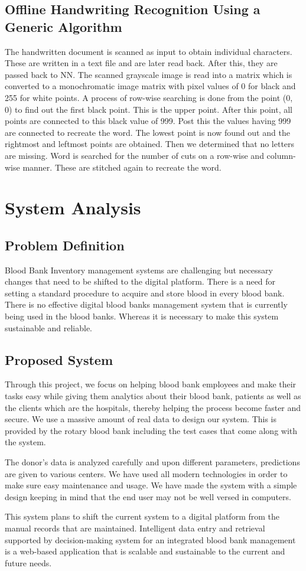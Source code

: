 \documentclass[BTech]{srmuthesis}
\begin{document}
\section{Offline Handwriting Recognition Using a Generic Algorithm}
The handwritten document is scanned as input to obtain individual characters. These are written in a text file and are later read back. After this, they are passed back to \ac{NN}. The scanned grayscale image is read into a matrix which is converted to a monochromatic image matrix with pixel values of 0 for black and 255 for white points. A process of row-wise searching is done from the point (0, 0) to find out the first black point. This is the upper point. After this point, all points are connected to this black value of 999. Post this the values having 999 are connected to recreate the word. The lowest point is now found out and the rightmost and leftmost points are obtained. Then we determined that no letters are missing. Word is searched for the number of cuts on a row-wise and column-wise manner. These are stitched again to recreate the word. \cite{handwritingalgobook}


\chapter{System Analysis}
\section{Problem Definition}
Blood Bank Inventory management systems are challenging but necessary changes that need to be shifted to the digital platform. There is a need for setting a standard procedure to acquire and store blood in every blood bank. There is no effective digital blood banks management system that is currently being used in the blood banks. Whereas it is necessary to make this system sustainable and reliable. \cite{medium_design_process}
\section{Proposed System}
Through this project, we focus on helping blood bank employees and make their tasks easy while giving them analytics about their blood bank, patients as well as the clients which are the hospitals, thereby helping the process become faster and secure. We use a massive amount of real data to design our system. This is provided by the rotary blood bank including the test cases that come along with the system.\par 
The donor's data is analyzed carefully and upon different parameters, predictions are given to various centers. We have used all modern technologies in order to make sure easy maintenance and usage. We have made the system with a simple design keeping in mind that the end user may not be well versed in computers.\par 
This system plans to shift the current system to a digital platform from the manual records that are maintained. Intelligent data entry and retrieval supported by decision-making system for an integrated blood bank management is a web-based application that is scalable and sustainable to the current and future needs.
\end{document}
